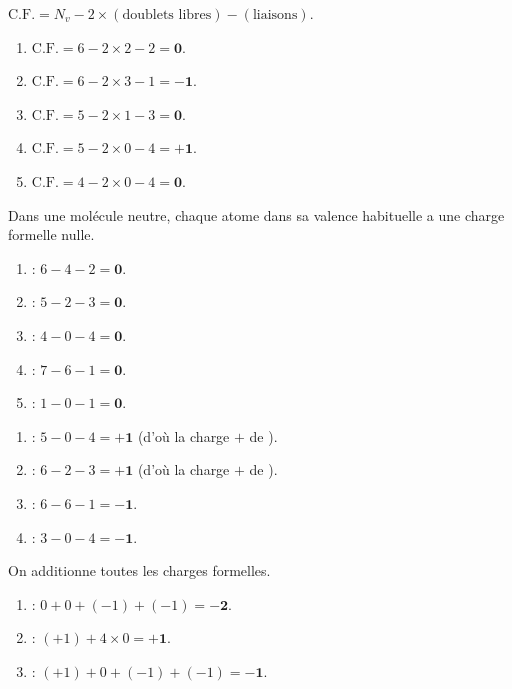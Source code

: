 \documentclass[11pt,a4paper]{article}
\begin{document}
\newcommand{\CF}{\ensuremath{\mathrm{C.F.}}}
\begin{corrige}
$\CF = N_v - 2\times(\text{doublets libres}) - (\text{liaisons})$.
\begin{enumerate}[label=\alph*)]
  \item $\CF = 6 - 2\times 2 - 2 = \mathbf{0}$.
  \item $\CF = 6 - 2\times 3 - 1 = \mathbf{-1}$.
  \item $\CF = 5 - 2\times 1 - 3 = \mathbf{0}$.
  \item $\CF = 5 - 2\times 0 - 4 = \mathbf{+1}$.
  \item $\CF = 4 - 2\times 0 - 4 = \mathbf{0}$.
\end{enumerate}
\end{corrige}

\begin{corrige}
Dans une molécule neutre, chaque atome dans sa valence habituelle a une charge formelle nulle.
\begin{enumerate}[label=\alph*)]
  \item {} : $6 - 4 - 2 = \mathbf{0}$.
  \item {} : $5 - 2 - 3 = \mathbf{0}$.
  \item {} : $4 - 0 - 4 = \mathbf{0}$.
  \item {} : $7 - 6 - 1 = \mathbf{0}$.
  \item {} : $1 - 0 - 1 = \mathbf{0}$.
\end{enumerate}
\end{corrige}

\begin{corrige}
\begin{enumerate}[label=\alph*)]
  \item {} : $5 - 0 - 4 = \mathbf{+1}$ (d'où la charge $+$ de ).
  \item {} : $6 - 2 - 3 = \mathbf{+1}$ (d'où la charge $+$ de ).
  \item {} : $6 - 6 - 1 = \mathbf{-1}$.
  \item {} : $3 - 0 - 4 = \mathbf{-1}$.
\end{enumerate}
\end{corrige}

\begin{corrige}
On additionne toutes les charges formelles.
\begin{enumerate}[label=\alph*)]
  \item {} : $0 + 0 + (-1) + (-1) = \mathbf{-2}$. \checkmark
  \item {} : $(+1) + 4\times 0 = \mathbf{+1}$. \checkmark
  \item {} : $(+1) + 0 + (-1) + (-1) = \mathbf{-1}$. \checkmark
\end{enumerate}
\end{corrige}
\end{document}
